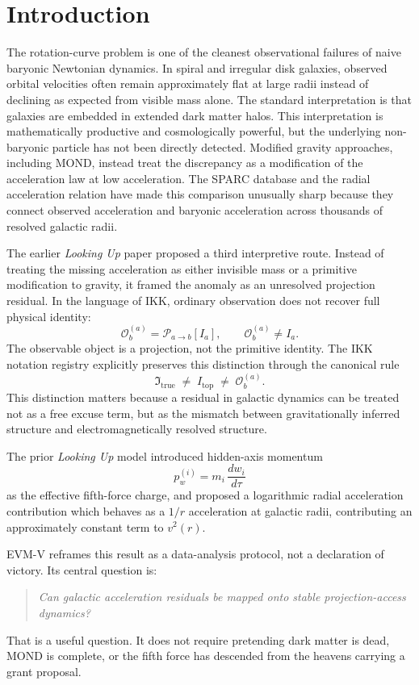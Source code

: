 \documentclass[11pt,a4paper,oneside]{article}
\newcommand{\Ia}{I_a}
\newcommand{\Itrue}{\mathfrak{I}_{\mathrm{true}}}
\newcommand{\Osp}{\mathcal{O}_b}
\newcommand{\Pab}{\mathcal{P}_{a\to b}}
\begin{document}
\section{Introduction}

The rotation-curve problem is one of the cleanest observational failures of naive
baryonic Newtonian dynamics. In spiral and irregular disk galaxies, observed orbital
velocities often remain approximately flat at large radii instead of declining as
expected from visible mass alone. The standard interpretation is that galaxies are
embedded in extended dark matter halos. This interpretation is mathematically productive
and cosmologically powerful, but the underlying non-baryonic particle has not been
directly detected. Modified gravity approaches, including MOND, instead treat the
discrepancy as a modification of the acceleration law at low acceleration. The SPARC
database and the radial acceleration relation have made this comparison unusually sharp
because they connect observed acceleration and baryonic acceleration across thousands of
resolved galactic radii.

The earlier \emph{Looking Up} paper proposed a third interpretive route. Instead of
treating the missing acceleration as either invisible mass or a primitive modification
to gravity, it framed the anomaly as an unresolved projection residual. In the language
of IKK, ordinary observation does not recover full physical identity:
\[
    \Osp^{(a)} = \Pab[\Ia], \qquad \Osp^{(a)} \neq \Ia.
\]
The observable object is a projection, not the primitive identity. The IKK notation
registry explicitly preserves this distinction through the canonical rule
\[
    \Itrue \;\neq\; I_{\mathrm{top}} \;\neq\; \Osp^{(a)}.
\]
This distinction matters because a residual in galactic dynamics can be treated not as
a free excuse term, but as the mismatch between gravitationally inferred structure and
electromagnetically resolved structure.

The prior \emph{Looking Up} model introduced hidden-axis momentum
\[
    p_w^{(i)} = m_i\,\frac{dw_i}{d\tau}
\]
as the effective fifth-force charge, and proposed a logarithmic radial acceleration
contribution which behaves as a $1/r$ acceleration at galactic radii, contributing an
approximately constant term to $v^2(r)$.

EVM-V reframes this result as a data-analysis protocol, not a declaration of victory.
Its central question is:
\begin{quote}
\textit{Can galactic acceleration residuals be mapped onto stable projection-access
dynamics?}
\end{quote}
That is a useful question. It does not require pretending dark matter is dead, MOND is
complete, or the fifth force has descended from the heavens carrying a grant proposal.
\end{document}

